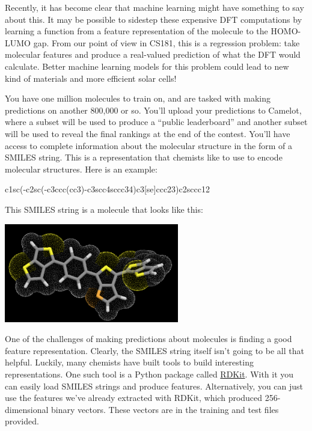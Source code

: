 \documentclass[12pt]{article}
\begin{document}
	Recently, it has become clear that machine learning might have something to say about this.  It may be possible to sidestep these expensive DFT computations by learning a function from a feature representation of the molecule to the HOMO-LUMO gap.  From our point of view in CS181, this is a regression problem: take molecular features and produce a real-valued prediction of what the DFT would calculate.  Better machine learning models for this problem could lead to new kind of materials and more efficient solar cells!
	
	You have one million molecules to train on, and are tasked with making predictions on another 800,000 or so.  You'll upload your predictions to Camelot, where a subset will be used to produce a ``public leaderboard'' and another subset will be used to reveal the final rankings at the end of the contest.  You'll have access to complete information about the molecular structure in the form of a SMILES string.  This is a representation that chemists like to use to encode molecular structures.  Here is an example:
	\begin{center}
		c1sc(-c2sc(-c3ccc(cc3)-c3scc4sccc34)c3[se]ccc23)c2sccc12
	\end{center}
	This SMILES string is a molecule that looks like this:
	\begin{center}
		\includegraphics[width=3in]{molecule}
	\end{center}
	
	One of the challenges of making predictions about molecules is finding a good feature representation.  Clearly, the SMILES string itself isn't going to be all that helpful.  Luckily, many chemists have built tools to build interesting representations.  One such tool is a Python package called \href{http://www.rdkit.org/}{RDKit}.  With it you can easily load SMILES strings and produce features. Alternatively, you can just use the features we've already extracted with RDKit, which produced 256-dimensional binary vectors.  These vectors are in the training and test files provided.
	
\end{document}
